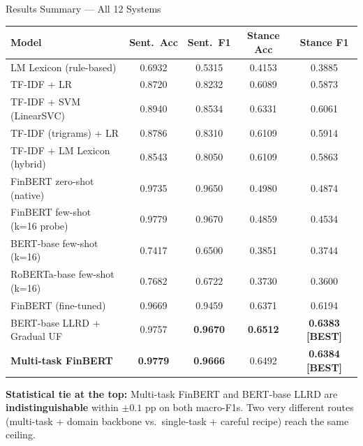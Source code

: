 \documentclass[10pt, aspectratio=169]{beamer}
\begin{document}
\begin{frame}[t]{Results Summary --- All 12 Systems}
    \vspace{-0.5em}
    \centering
    {\footnotesize
    \begin{tabular}{lcccc}
        \toprule
        \textbf{Model} & \textbf{Sent.\ Acc} & \textbf{Sent.\ F1} & \textbf{Stance Acc} & \textbf{Stance F1} \\
        \midrule
        LM Lexicon (rule-based)             & 0.6932 & 0.5315 & 0.4153 & 0.3885 \\
        TF-IDF + LR                         & 0.8720 & 0.8232 & 0.6089 & 0.5873 \\
        TF-IDF + SVM (LinearSVC)            & 0.8940 & 0.8534 & 0.6331 & 0.6061 \\
        TF-IDF (trigrams) + LR              & 0.8786 & 0.8310 & 0.6109 & 0.5914 \\
        TF-IDF + LM Lexicon (hybrid)        & 0.8543 & 0.8050 & 0.6109 & 0.5863 \\
        \midrule
        FinBERT zero-shot (native)          & 0.9735 & 0.9650 & 0.4980 & 0.4874 \\
        FinBERT few-shot (k=16 probe)       & 0.9779 & 0.9670 & 0.4859 & 0.4534 \\
        BERT-base few-shot (k=16)           & 0.7417 & 0.6500 & 0.3851 & 0.3744 \\
        RoBERTa-base few-shot (k=16)        & 0.7682 & 0.6722 & 0.3730 & 0.3600 \\
        \midrule
        FinBERT (fine-tuned)                & 0.9669 & 0.9459 & 0.6371 & 0.6194 \\
        \rowcolor{UNSWYellow!30}
        BERT-base LLRD + Gradual UF         & 0.9757 & \textbf{0.9670} & \textbf{0.6512} & \textbf{0.6383} \textbf{[BEST]} \\
        \rowcolor{UNSWYellow!30}
        \textbf{Multi-task FinBERT}         & \textbf{0.9779} & \textbf{0.9666} & 0.6492 & \textbf{0.6384} \textbf{[BEST]} \\
        \bottomrule
    \end{tabular}
    }

    \vspace{0.4em}
    {\small \textbf{Statistical tie at the top:} Multi-task FinBERT and BERT-base LLRD are \textbf{indistinguishable} within $\pm 0.1$ pp on both macro-F1s. Two very different routes (multi-task + domain backbone vs.\ single-task + careful recipe) reach the same ceiling.}
\end{frame}
\end{document}
